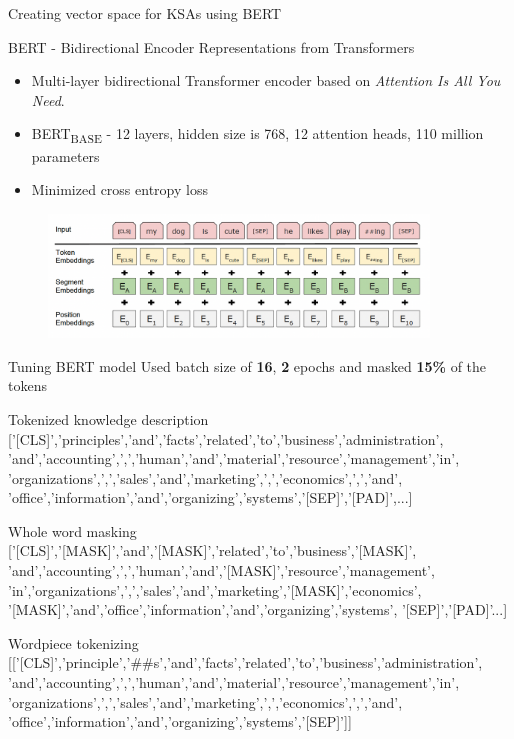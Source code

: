 \documentclass{beamer}
\begin{document}
\begin{frame}{Creating vector space for KSAs using BERT}

  BERT - Bidirectional Encoder Representations from Transformers\cite{bert}
  \begin{itemize}
    \item Multi-layer bidirectional Transformer encoder based on \textit{Attention Is All You Need}.\cite{attention}
    \item BERT\textsubscript{BASE} - 12 layers, hidden size is 768, 12 attention heads, 110 million parameters
    \item Minimized cross entropy loss
  \end{itemize}
  
  \begin{figure}[ht!]
    \centering
    \includegraphics[width=0.9\textwidth]{images/bert.png}
  \end{figure}
  
\end{frame}

\begin{frame}{Tuning BERT model}
 \scriptsize
  Used batch size of \textbf{16}, \textbf{2} epochs and masked \textbf{15\%} of the tokens

  \begin{exampleblock}{Tokenized knowledge description}
    ['[CLS]','principles','and','facts','related','to','business','administration',
    'and','accounting',',','human','and','material','resource','management','in',
    'organizations',',','sales','and','marketing',',','economics',',','and',
    'office','information','and','organizing','systems','[SEP]','[PAD]',...]
  \end{exampleblock}

  \begin{exampleblock}{Whole word masking}
    ['[CLS]','[MASK]','and','[MASK]','related','to','business','[MASK]',
    'and','accounting',',','human','and','[MASK]','resource','management',
    'in','organizations',',','sales','and','marketing','[MASK]','economics',
    '[MASK]','and','office','information','and','organizing','systems',
    '[SEP]','[PAD]'...]
  \end{exampleblock}

  \begin{exampleblock}{Wordpiece\cite{wordpiece} tokenizing}
    [['[CLS]','principle','\#\#s','and','facts','related','to','business','administration',
    'and','accounting',',','human','and','material','resource','management','in',
    'organizations',',','sales','and','marketing',',','economics',',','and',
    'office','information','and','organizing','systems','[SEP]']]
  \end{exampleblock}
  
\end{frame}
\end{document}
